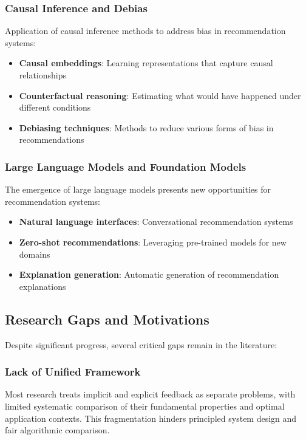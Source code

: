 \subsubsection{Causal Inference and Debias}
Application of causal inference methods to address bias in recommendation systems:
\begin{itemize}
    \item \textbf{Causal embeddings}: Learning representations that capture causal relationships~\cite{bonner2018causal}
    \item \textbf{Counterfactual reasoning}: Estimating what would have happened under different conditions~\cite{schnabel2016recommendations}
    \item \textbf{Debiasing techniques}: Methods to reduce various forms of bias in recommendations~\cite{chen2020bias}
\end{itemize}

\subsubsection{Large Language Models and Foundation Models}
The emergence of large language models presents new opportunities for recommendation systems:
\begin{itemize}
    \item \textbf{Natural language interfaces}: Conversational recommendation systems~\cite{gao2021advances}
    \item \textbf{Zero-shot recommendations}: Leveraging pre-trained models for new domains~\cite{hou2023large}
    \item \textbf{Explanation generation}: Automatic generation of recommendation explanations~\cite{zhang2020explainable}
\end{itemize}

\subsection{Research Gaps and Motivations}

Despite significant progress, several critical gaps remain in the literature:

\subsubsection{Lack of Unified Framework}
Most research treats implicit and explicit feedback as separate problems, with limited systematic comparison of their fundamental properties and optimal application contexts. This fragmentation hinders principled system design and fair algorithmic comparison.

